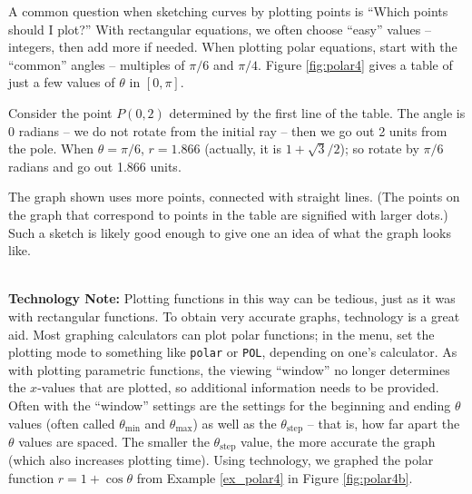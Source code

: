 {A common question when sketching curves by plotting points is ``Which points should I plot?'' With rectangular equations, we often choose ``easy'' values -- integers, then add more if needed. When plotting polar equations, start with the ``common'' angles -- multiples of $\pi/6$ and $\pi/4$. Figure \ref{fig:polar4} gives a table of just a few values of $\theta$ in $[0,\pi]$. 

Consider the point $P(0,2)$ determined by the first line of the table. The angle is 0 radians -- we do not rotate from the initial ray -- then we go out 2 units from the pole. When $\theta=\pi/6$, $r = 1.866$ (actually, it is $1+\sqrt{3}/2$); so rotate by $\pi/6$ radians and go out 1.866 units. 

The graph shown uses more points, connected with straight lines. (The points on the graph that correspond to points in the table are signified with larger dots.) Such a sketch is likely good enough to give one an idea of what the graph looks like.
}\\

\noindent\textbf{Technology Note:} Plotting functions in this way can be tedious, just as it was with rectangular functions. To obtain very accurate graphs, technology is a great aid. Most graphing calculators can plot polar functions; in the menu, set the plotting mode to something like \texttt{polar} or \texttt{POL}, depending on one's calculator. As with plotting parametric functions, the viewing ``window'' no longer determines the $x$-values that are plotted, so additional information needs to be provided. Often with the ``window'' settings are the settings for  the beginning and ending $\theta$ values (often called \texttt{$\theta_{\text{min}}$} and \texttt{$\theta_{\text{max}}$}) as well as the \texttt{$\theta_{\text{step}}$} -- that is, how far apart the $\theta$ values are spaced. The smaller the \texttt{$\theta_{\text{step}}$} value, the more accurate the graph (which also increases plotting time). Using technology, we graphed the polar function $r=1+\cos \theta$ from Example \ref{ex_polar4} in Figure \ref{fig:polar4b}.
\\


